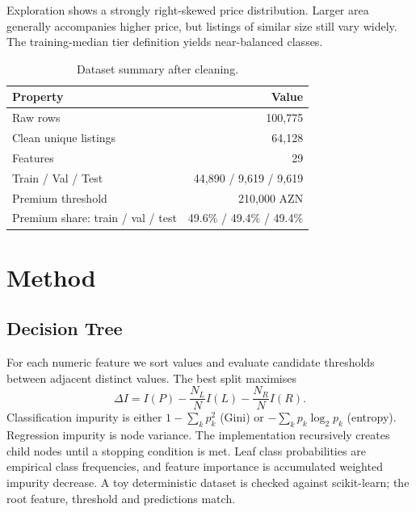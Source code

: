 \documentclass[10pt,twocolumn,a4paper]{article}
\begin{document}
Exploration shows a strongly right-skewed price distribution. Larger area generally accompanies higher price, but listings of similar size still vary widely. The training-median tier definition yields near-balanced classes.

\begin{table}[t]
\centering
\caption{Dataset summary after cleaning.}
\label{tab:data}
\begin{tabular}{@{}lr@{}}
\toprule
Property & Value \\
\midrule
Raw rows & 100,775 \\
Clean unique listings & 64,128 \\
Features & 29 \\
Train / Val / Test & 44,890 / 9,619 / 9,619 \\
Premium threshold & 210,000 AZN \\
Premium share: train / val / test & 49.6\% / 49.4\% / 49.4\% \\
\bottomrule
\end{tabular}
\end{table}

\section{Method}
\subsection{Decision Tree}
For each numeric feature we sort values and evaluate candidate thresholds between adjacent distinct values. The best split maximises
\begin{equation}
\Delta I=I(P)-\frac{N_L}{N}I(L)-\frac{N_R}{N}I(R).
\end{equation}
Classification impurity is either $1-\sum_k p_k^2$ (Gini) or $-\sum_k p_k\log_2 p_k$ (entropy). Regression impurity is node variance. The implementation recursively creates child nodes until a stopping condition is met. Leaf class probabilities are empirical class frequencies, and feature importance is accumulated weighted impurity decrease. A toy deterministic dataset is checked against scikit-learn; the root feature, threshold and predictions match.
\end{document}
